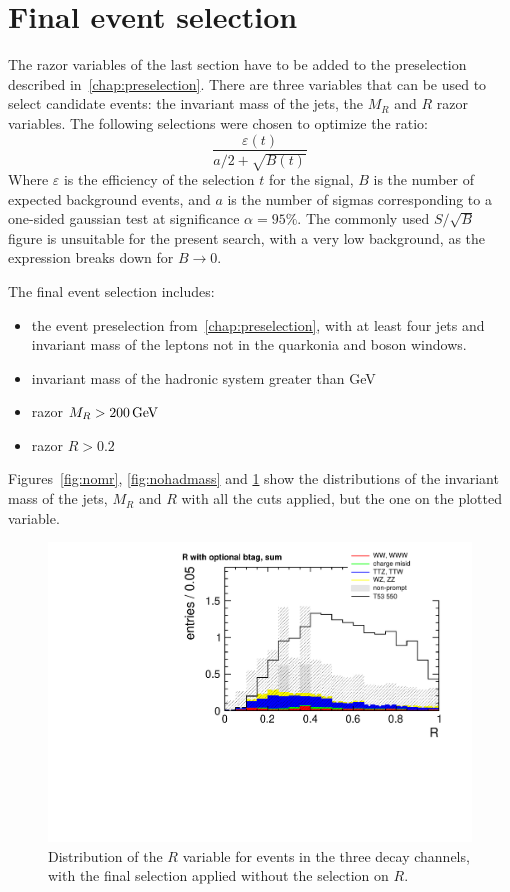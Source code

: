 \section{Final event selection}
The razor variables of the last section have to be added to the preselection
described in~\ref{chap:preselection}. There are three variables that can be
used to select candidate \TP events: the invariant mass of the jets, the
$M_R$ and $R$ razor variables. The following selections were chosen to
optimize the ratio\cite{punzi}:
\begin{equation*}
    \dfrac{\varepsilon(t)}{a/2 + \sqrt{B(t)}}
\end{equation*}
Where $\varepsilon$ is the efficiency of the selection $t$ for the signal,
$B$ is the number of expected background events, and $a$ is the number of
sigmas corresponding to a one-sided gaussian test at significance $\alpha =
95\%$.
The commonly used $S/\sqrt{B}$ figure is unsuitable for the present search,
with a very low background, as the expression breaks down for $B\rightarrow
0$.

The final event selection includes:
\begin{itemize}
    \item the event preselection from~\ref{chap:preselection}, with at least
        four jets and invariant mass of the leptons not in the quarkonia and
        \Z boson windows.
    \item invariant mass of the hadronic system greater than
        \unit[350]{GeV}
    \item razor $M_R > \unit[200]{GeV}$
    \item razor $R > 0.2$
\end{itemize}
Figures~\ref{fig:nomr}, \ref{fig:nohadmass} and \ref{fig:nor} show the distributions of the invariant mass of the jets,
$M_R$ and $R$ with all the cuts applied, but the one on the plotted
variable.

\begin{figure}[htb]
    \centering
    \includegraphics[width=.7\textwidth]{images/pdf/4jets_AND_mr200_AND_had_mass350/r_optional_btag_sum_0}
    \caption{Distribution of the $R$ variable for events in the three decay
        channels, with the final
    selection applied without the selection on $R$.}
    \label{fig:nor}
\end{figure}


